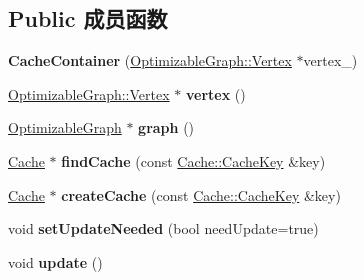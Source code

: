 \subsection*{Public 成员函数}
\begin{DoxyCompactItemize}
\item 
\hypertarget{classg2o_1_1CacheContainer_aed510932f7e499f2fd3c1fdea7809052}{{\bfseries Cache\-Container} (\hyperlink{classg2o_1_1OptimizableGraph_1_1Vertex}{Optimizable\-Graph\-::\-Vertex} $\ast$vertex\-\_\-)}\label{classg2o_1_1CacheContainer_aed510932f7e499f2fd3c1fdea7809052}

\item 
\hypertarget{classg2o_1_1CacheContainer_ada4f7f82992a85dbc742c1ab24c39c08}{\hyperlink{classg2o_1_1OptimizableGraph_1_1Vertex}{Optimizable\-Graph\-::\-Vertex} $\ast$ {\bfseries vertex} ()}\label{classg2o_1_1CacheContainer_ada4f7f82992a85dbc742c1ab24c39c08}

\item 
\hypertarget{classg2o_1_1CacheContainer_a4bf79d27bb9ae377446dfa7fd048b06d}{\hyperlink{structg2o_1_1OptimizableGraph}{Optimizable\-Graph} $\ast$ {\bfseries graph} ()}\label{classg2o_1_1CacheContainer_a4bf79d27bb9ae377446dfa7fd048b06d}

\item 
\hypertarget{classg2o_1_1CacheContainer_a2a0230117e0e71210f3d10a9e7143d0f}{\hyperlink{classg2o_1_1Cache}{Cache} $\ast$ {\bfseries find\-Cache} (const \hyperlink{classg2o_1_1Cache_1_1CacheKey}{Cache\-::\-Cache\-Key} \&key)}\label{classg2o_1_1CacheContainer_a2a0230117e0e71210f3d10a9e7143d0f}

\item 
\hypertarget{classg2o_1_1CacheContainer_a08902c228901e06c4e08c5b594683a6c}{\hyperlink{classg2o_1_1Cache}{Cache} $\ast$ {\bfseries create\-Cache} (const \hyperlink{classg2o_1_1Cache_1_1CacheKey}{Cache\-::\-Cache\-Key} \&key)}\label{classg2o_1_1CacheContainer_a08902c228901e06c4e08c5b594683a6c}

\item 
\hypertarget{classg2o_1_1CacheContainer_a2241f992e90c1078447553d0833ccf14}{void {\bfseries set\-Update\-Needed} (bool need\-Update=true)}\label{classg2o_1_1CacheContainer_a2241f992e90c1078447553d0833ccf14}

\item 
\hypertarget{classg2o_1_1CacheContainer_acc9a6d1fbc828f55b1a6af1c29f003df}{void {\bfseries update} ()}\label{classg2o_1_1CacheContainer_acc9a6d1fbc828f55b1a6af1c29f003df}

\end{DoxyCompactItemize}
